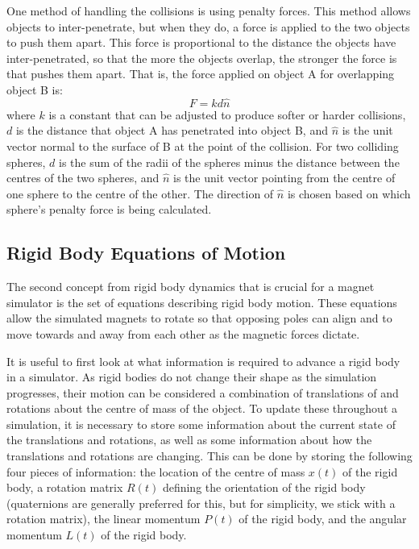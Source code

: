 \documentclass[tog]{acmsiggraph}
\begin{document}
One method of handling the collisions is using penalty forces. This method allows objects to inter-penetrate, but when they do, a force is applied to the two objects to push them apart. This force is proportional to the distance the objects have inter-penetrated, so that the more the objects overlap, the stronger the force is that pushes them apart. That is, the force applied on object A for overlapping object B is:
\begin{equation}
 F = kd\hat{n}
\end{equation}
where $k$ is a constant that can be adjusted to produce softer or harder collisions, $d$ is the distance that object A has penetrated into object B, and $\hat{n}$ is the unit vector normal to the surface of B at the point of the collision. For two colliding spheres, $d$ is the sum of the radii of the spheres minus the distance between the centres of the two spheres, and $\hat{n}$ is the unit vector pointing from the centre of one sphere to the centre of the other. The direction of $\hat{n}$ is chosen based on which sphere's penalty force is being calculated.

\subsection{Rigid Body Equations of Motion}

The second concept from rigid body dynamics that is crucial for a magnet simulator is the set of equations describing rigid body motion. These equations allow the simulated magnets to rotate so that opposing poles can align and to move towards and away from each other as the magnetic forces dictate.

It is useful to first look at what information is required to advance a rigid body in a simulator. As rigid bodies do not change their shape as the simulation progresses, their motion can be considered a combination of translations of and rotations about the centre of mass of the object. To update these throughout a simulation, it is necessary to store some information about the current state of the translations and rotations, as well as some information about how the translations and rotations are changing. This can be done by storing the following four pieces of information: the location of the centre of mass $x(t)$ of the rigid body, a rotation matrix $R(t)$ defining the orientation of the rigid body (quaternions are generally preferred for this, but for simplicity, we stick with a rotation matrix), the linear momentum $P(t)$ of the rigid body, and the angular momentum $L(t)$ of the rigid body.
\end{document}

